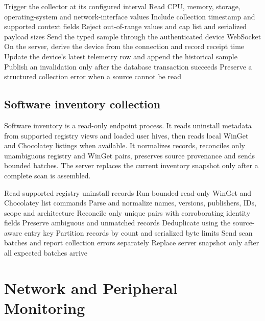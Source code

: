 \documentclass[12pt,a4paper]{report}
\begin{document}
\begin{algorithm}[H]
\caption{Telemetry collection and ingestion}
\label{alg:telemetry}
\begin{algorithmic}[1]
\State Trigger the collector at its configured interval
\State Read CPU, memory, storage, operating-system and network-interface values
\State Include collection timestamp and supported context fields
\State Reject out-of-range values and cap list and serialized payload sizes
\State Send the typed sample through the authenticated device WebSocket
\State On the server, derive the device from the connection and record receipt time
\State Update the device's latest telemetry row and append the historical sample
\State Publish an invalidation only after the database transaction succeeds
\State Preserve a structured collection error when a source cannot be read
\end{algorithmic}
\end{algorithm}

\subsection{Software inventory collection}
Software inventory is a read-only endpoint process. It reads uninstall
metadata from supported registry views and loaded user hives, then reads local
WinGet and Chocolatey listings when available. It normalizes records, reconciles
only unambiguous registry and WinGet pairs, preserves source provenance and
sends bounded batches. The server replaces the current inventory snapshot only
after a complete scan is assembled.

\begin{algorithm}[H]
\caption{Software inventory collection}
\label{alg:inventory}
\begin{algorithmic}[1]
\State Read supported registry uninstall records
\State Run bounded read-only WinGet and Chocolatey list commands
\State Parse and normalize names, versions, publishers, IDs, scope and architecture
\State Reconcile only unique pairs with corroborating identity fields
\State Preserve ambiguous and unmatched records
\State Deduplicate using the source-aware entry key
\State Partition records by count and serialized byte limits
\State Send scan batches and report collection errors separately
\State Replace server snapshot only after all expected batches arrive
\end{algorithmic}
\end{algorithm}

\section{Network and Peripheral Monitoring}
\end{document}
